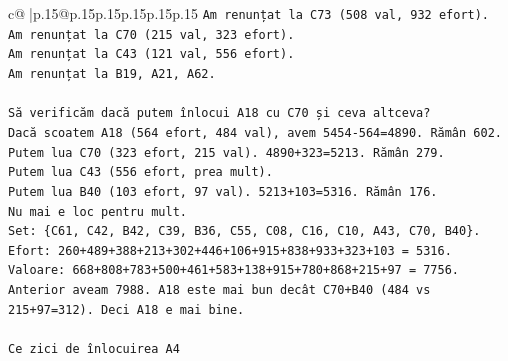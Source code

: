 \documentclass{article}
\begin{document}
{\begin{supertabular}{c@{$\;$}|p{.15\linewidth}@{}p{.15\linewidth}p{.15\linewidth}p{.15\linewidth}p{.15\linewidth}p{.15\linewidth}}
{{{\texttt{Am renunțat la C73 (508 val, 932 efort).} \\
\texttt{Am renunțat la C70 (215 val, 323 efort).} \\
\texttt{Am renunțat la C43 (121 val, 556 efort).} \\
\texttt{Am renunțat la B19, A21, A62.} \\
\\ 
\texttt{Să verificăm dacă putem înlocui A18 cu C70 și ceva altceva?} \\
\texttt{Dacă scoatem A18 (564 efort, 484 val), avem 5454{-}564=4890. Rămân 602.} \\
\texttt{Putem lua C70 (323 efort, 215 val). 4890+323=5213. Rămân 279.} \\
\texttt{Putem lua C43 (556 efort, prea mult).} \\
\texttt{Putem lua B40 (103 efort, 97 val). 5213+103=5316. Rămân 176.} \\
\texttt{Nu mai e loc pentru mult.} \\
\texttt{Set: \{C61, C42, B42, C39, B36, C55, C08, C16, C10, A43, C70, B40\}.} \\
\texttt{Efort: 260+489+388+213+302+446+106+915+838+933+323+103 = 5316.} \\
\texttt{Valoare: 668+808+783+500+461+583+138+915+780+868+215+97 = 7756.} \\
\texttt{Anterior aveam 7988. A18 este mai bun decât C70+B40 (484 vs 215+97=312). Deci A18 e mai bine.} \\
\\ 
\texttt{Ce zici de înlocuirea A4} \\
            }
        }
    }
     \\ \\


\end{supertabular}}
\end{document}
